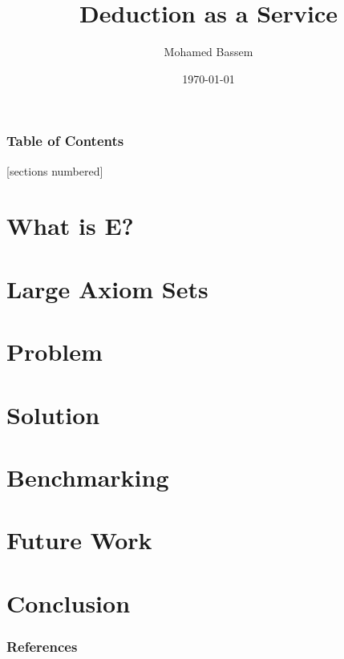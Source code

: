 \documentclass[10pt]{beamer}
\title{Deduction as a Service}
\subtitle{}
\date{\today}
\author{Mohamed Bassem}
\institute{German University in Cairo}
\begin{document}
\maketitle

\begin{frame}
  \frametitle{Table of Contents}
  [sections numbered]
  \tableofcontents[hideallsubsections]
\end{frame}

\section{What is E?}
\begin{frame}[fragile]
\end{frame}


\section{Large Axiom Sets}
\begin{frame}[fragile]
\end{frame}


\section{Problem}
\begin{frame}[fragile]
\end{frame}


\section{Solution}
\begin{frame}[fragile]
\end{frame}


\section{Benchmarking}
\begin{frame}[fragile]
\end{frame}


\section{Future Work}
\begin{frame}[fragile]
\end{frame}


\section{Conclusion}
\begin{frame}[fragile]
\end{frame}


\begin{frame}[allowframebreaks]

  \frametitle{References}

  
  

\end{frame}
\end{document}
